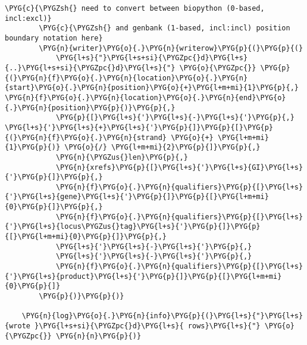 \begin{Verbatim}[commandchars=\\\{\}]
        \PYG{c}{\PYGZsh{} need to convert between biopython (0-based, incl:excl)}
        \PYG{c}{\PYGZsh{} and genbank (1-based, incl:incl) position boundary notation here}
        \PYG{n}{writer}\PYG{o}{.}\PYG{n}{writerow}\PYG{p}{(}\PYG{p}{(}
            \PYG{l+s}{"}\PYG{l+s+si}{\PYGZpc{}d}\PYG{l+s}{..}\PYG{l+s+si}{\PYGZpc{}d}\PYG{l+s}{"} \PYG{o}{\PYGZpc{}} \PYG{p}{(}\PYG{n}{f}\PYG{o}{.}\PYG{n}{location}\PYG{o}{.}\PYG{n}{start}\PYG{o}{.}\PYG{n}{position}\PYG{o}{+}\PYG{l+m+mi}{1}\PYG{p}{,} \PYG{n}{f}\PYG{o}{.}\PYG{n}{location}\PYG{o}{.}\PYG{n}{end}\PYG{o}{.}\PYG{n}{position}\PYG{p}{)}\PYG{p}{,}
            \PYG{p}{[}\PYG{l+s}{'}\PYG{l+s}{-}\PYG{l+s}{'}\PYG{p}{,} \PYG{l+s}{'}\PYG{l+s}{+}\PYG{l+s}{'}\PYG{p}{]}\PYG{p}{[}\PYG{p}{(}\PYG{n}{f}\PYG{o}{.}\PYG{n}{strand} \PYG{o}{+} \PYG{l+m+mi}{1}\PYG{p}{)} \PYG{o}{/} \PYG{l+m+mi}{2}\PYG{p}{]}\PYG{p}{,}
            \PYG{n}{\PYGZus{}len}\PYG{p}{,}
            \PYG{n}{xrefs}\PYG{p}{[}\PYG{l+s}{'}\PYG{l+s}{GI}\PYG{l+s}{'}\PYG{p}{]}\PYG{p}{,}
            \PYG{n}{f}\PYG{o}{.}\PYG{n}{qualifiers}\PYG{p}{[}\PYG{l+s}{'}\PYG{l+s}{gene}\PYG{l+s}{'}\PYG{p}{]}\PYG{p}{[}\PYG{l+m+mi}{0}\PYG{p}{]}\PYG{p}{,}
            \PYG{n}{f}\PYG{o}{.}\PYG{n}{qualifiers}\PYG{p}{[}\PYG{l+s}{'}\PYG{l+s}{locus\PYGZus{}tag}\PYG{l+s}{'}\PYG{p}{]}\PYG{p}{[}\PYG{l+m+mi}{0}\PYG{p}{]}\PYG{p}{,}
            \PYG{l+s}{'}\PYG{l+s}{-}\PYG{l+s}{'}\PYG{p}{,}
            \PYG{l+s}{'}\PYG{l+s}{-}\PYG{l+s}{'}\PYG{p}{,}
            \PYG{n}{f}\PYG{o}{.}\PYG{n}{qualifiers}\PYG{p}{[}\PYG{l+s}{'}\PYG{l+s}{product}\PYG{l+s}{'}\PYG{p}{]}\PYG{p}{[}\PYG{l+m+mi}{0}\PYG{p}{]}
        \PYG{p}{)}\PYG{p}{)}

    \PYG{n}{log}\PYG{o}{.}\PYG{n}{info}\PYG{p}{(}\PYG{l+s}{"}\PYG{l+s}{wrote }\PYG{l+s+si}{\PYGZpc{}d}\PYG{l+s}{ rows}\PYG{l+s}{"} \PYG{o}{\PYGZpc{}} \PYG{n}{n}\PYG{p}{)}
\end{Verbatim}


